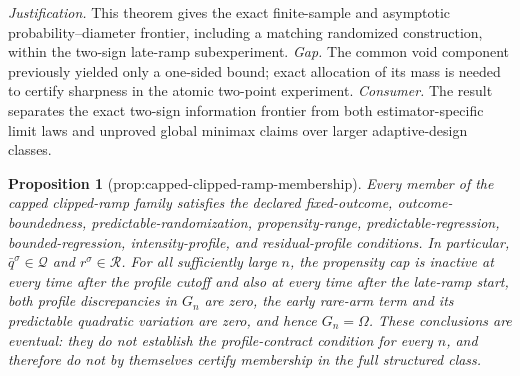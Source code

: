 \documentclass{article}
\newtheorem{proposition}{Proposition}
\begin{document}
\par\smallskip\noindent \textit{Justification.} This theorem gives the exact finite-sample and asymptotic probability--diameter frontier, including a matching randomized construction, within the two-sign late-ramp subexperiment. \textit{Gap.} The common void component previously yielded only a one-sided bound; exact allocation of its mass is needed to certify sharpness in the atomic two-point experiment. \textit{Consumer.} The result separates the exact two-sign information frontier from both estimator-specific limit laws and unproved global minimax claims over larger adaptive-design classes.

\begin{proposition}[prop:capped-clipped-ramp-membership]\label{prop:capped-clipped-ramp-membership}
Every member of the capped clipped-ramp family satisfies the declared fixed-outcome, outcome-boundedness, predictable-randomization, propensity-range, predictable-regression, bounded-regression, intensity-profile, and residual-profile conditions. In particular, \(\bar q^\sigma\in\mathcal Q\) and \(r^\sigma\in\mathcal R\). For all sufficiently large \(n\), the propensity cap is inactive at every time after the profile cutoff and also at every time after the late-ramp start, both profile discrepancies in \(G_n\) are zero, the early rare-arm term and its predictable quadratic variation are zero, and hence \(G_n=\Omega\). These conclusions are eventual: they do not establish the profile-contract condition for every \(n\), and therefore do not by themselves certify membership in the full structured class.
\end{proposition}
\end{document}
